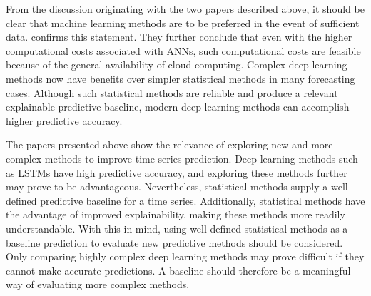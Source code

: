 From the discussion originating with the two papers described above,
it should be clear that machine learning methods are to be preferred in the event of sufficient data.
\cite{Hewamalage2021} confirms this statement. They further conclude that even with the higher computational costs
associated with ANNs, such computational costs are feasible because of the general availability of cloud computing.
Complex deep learning methods now have benefits over simpler statistical methods in many forecasting cases.
Although such statistical methods are reliable and produce a relevant explainable predictive baseline,
modern deep learning methods can accomplish higher predictive accuracy.

The papers presented above show the relevance of exploring new and more complex methods to improve time series prediction.
Deep learning methods such as LSTMs have high predictive accuracy,
and exploring these methods further may prove to be advantageous.
Nevertheless, statistical methods supply a well-defined predictive baseline for a time series.
Additionally, statistical methods have the advantage of improved explainability,
making these methods more readily understandable.
With this in mind, using well-defined statistical methods as a baseline prediction to evaluate new predictive methods should be considered.
Only comparing highly complex deep learning methods may prove difficult if they cannot make accurate predictions.
A baseline should therefore be a meaningful way of evaluating more complex methods.

